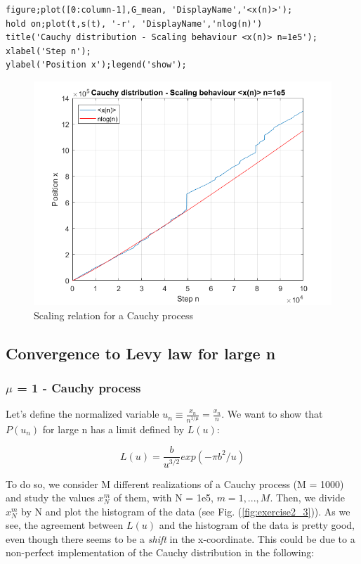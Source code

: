 \documentclass[11pt,letterpaper]{article}
\begin{document}
\begin{lstlisting}
figure;plot([0:column-1],G_mean, 'DisplayName','<x(n)>');
hold on;plot(t,s(t), '-r', 'DisplayName','nlog(n)')
title('Cauchy distribution - Scaling behaviour <x(n)> n=1e5');
xlabel('Step n');
ylabel('Position x');legend('show');
\end{lstlisting}

\begin{figure}
\centering
\includegraphics[width=0.9\linewidth]{./exercise2_2}
\caption{Scaling relation for a Cauchy process}
\label{fig:exercise2_2}
\end{figure}

\subsection{Convergence to Levy law for large n}
\subsubsection{$\mu$ = 1 - Cauchy process}
Let's define the normalized variable $u_n \equiv \frac{x_n}{n^{1/\mu}} = \frac{x_n}{n}$. We want to show that $P(u_n)$ for large n has a limit defined by $L(u)$:

\begin{equation}
L(u) = \frac{b}{u^{3/2}}exp(-\pi b^2/u)
\end{equation}

To do so, we consider M different realizations of a Cauchy process (M = 1000) and study the values $x_N^m$ of them, with N = 1e5, $m = 1,..., M$. Then, we divide $x_N^m$ by N and plot the histogram of the data (see Fig. (\ref{fig:exercise2_3})). As we see, the agreement between $L(u)$ and the histogram of the data is pretty good, even though there seems to be a \textit{shift} in the x-coordinate. This could be due to a non-perfect implementation of the Cauchy distribution in the following:
\end{document}
